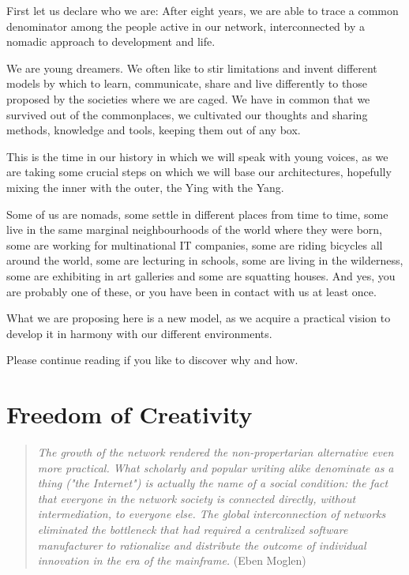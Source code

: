 F\hbox{}irst let us declare who we are: After eight years, we are able to trace
a common denominator among the people active in our network, interconnected by a
nomadic approach to development and life.

We are young dreamers. We often like to stir limitations and invent
dif\hbox{}ferent models by which to learn, communicate, share and live
dif\hbox{}ferently to those proposed by the societies where we are caged. We
have in common that we survived out of the commonplaces, we cultivated our
thoughts and sharing methods, knowledge and tools, keeping them out of any box.

This is the time in our history in which we will speak with young voices, as we
are taking some crucial steps on which we will base our architectures, hopefully
mixing the inner with the outer, the Ying with the Yang.

Some of us are nomads, some settle in dif\hbox{}ferent places from time to time,
some live in the same marginal neighbourhoods of the world where they were born,
some are working for multinational IT companies, some are riding bicycles all
around the world, some are lecturing in schools, some are living in the
wilderness, some are exhibiting in art galleries and some are squatting houses.
And yes, you are probably one of these, or you have been in contact with us at
least once.

What we are proposing here is a new model, as we acquire a practical vision to
develop it in harmony with our dif\hbox{}ferent environments.

Please continue reading if you like to discover why and how.


\section{Freedom of Creativity}
\label{s:weaver_birds:freedom_creativity}

\begin{quote}
\textit{The growth of the network rendered the non-propertarian alternative even
more practical. What scholarly and popular writing alike denominate as a thing
("the Internet") is actually the name of a social condition: the fact that
everyone in the network society is connected directly, without intermediation,
to everyone else. The global interconnection of networks eliminated the
bottleneck that had required a centralized software manufacturer to rationalize
and distribute the outcome of individual innovation in the era of the
mainframe.} (Eben Moglen)
\end{quote}

